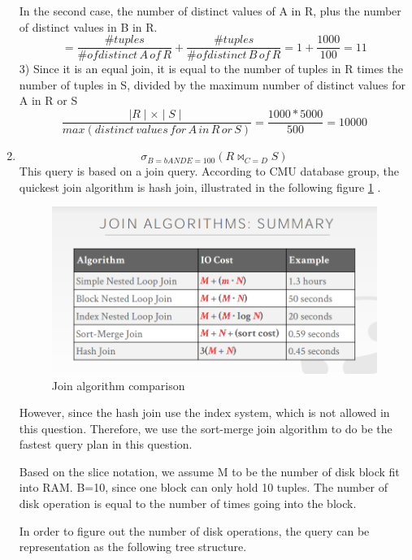 \documentclass{article}
\begin{document}
\begin{enumerate}[label=(\alph*)]
In the second case, the number of distinct values of A in R, plus the number of distinct values in B in R.
\begin{equation}
      =\frac{\#tuples}{\# of distinct\,A\,of\,R}+\frac{\# tuples}{\# of distinct\,B\,of\,R}=1+\frac{1000}{100}=11
\end{equation}
3)
Since it is an equal join, it is equal to the number of tuples in R times the number of tuples in S, divided by the maximum number of distinct values for A in R or S
\begin{equation}
    \frac{\mid R \mid \times \mid S \mid }{max(distinct\,values\,for\,A\,in\,R\,or\,S)}=\frac{1000*5000}{500}=10000
\end{equation}
\item  
 $$\sigma_{B=b AND E=100}(R \bowtie_{C=D}S)$$
 This query is based on a join query.
According to CMU database group, the quickest join algorithm is hash join, illustrated in the following figure \ref{fig:my_label} \cite{CMU1544518:online}.
\begin{figure}[H]
    \centering
    \includegraphics[width=14cm]{Capture.PNG}
    \caption{Join algorithm comparison}
    \label{fig:my_label}
\end{figure}
However, since the hash join use the index system, which is not allowed in this question. Therefore, we use the sort-merge join algorithm to do be the fastest query plan in this question. 

Based on the slice notation, we assume M to be the number of disk block fit into RAM.
B=10, since one block can only hold 10 tuples.
The number of disk operation is equal to the number of times going into the block.

In order to figure out the number of disk operations, the query can be representation as the following tree structure.
\begin{center}
\end{center}
\end{enumerate}
\end{document}
